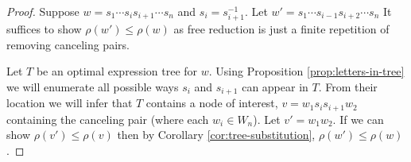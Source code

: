 \documentclass[12pt]{thesis}
\begin{document}
\begin{proof}
Suppose $w = s_{1} \cdots s_{i}s_{i+1} \cdots s_{n}$ 
and $s_{i} = s_{i+1}^{-1}$.
Let $w' = s_{1} \cdots s_{i-1}s_{i+2}\cdots s_{n}$
It suffices to show $\rho(w') \leq \rho(w)$
as free reduction is just a finite repetition
of removing canceling pairs.

Let $T$ be an optimal expression tree for $w$.
Using Proposition \ref{prop:letters-in-tree}
we will enumerate all possible ways $s_{i}$
and $s_{i+1}$ can appear in $T$.
From their location we will infer that $T$ contains
    a node of interest, $v = w_{1}s_{i} s_{i+1}w_{2}$
    containing the canceling pair (where each $w_{i} \in W_{n}$).
Let $v' = w_{1}w_{2}$. 
If we can show $\rho(v') \leq \rho(v)$
    then by Corollary \ref{cor:tree-substitution}, $\rho(w') \leq \rho(w)$.


\end{proof}
\end{document}
